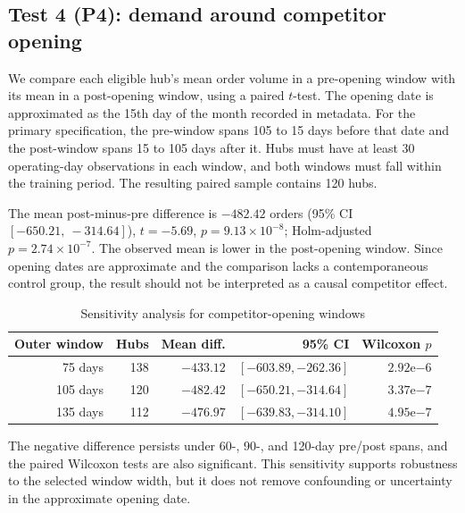 \documentclass[10pt,a4paper,twocolumn]{article}
\begin{document}
\subsection{Test 4 (P4): demand around competitor opening}
We compare each eligible hub's mean order volume in a pre-opening window with its mean in a post-opening window, using a paired $t$-test. The opening date is approximated as the 15th day of the month recorded in metadata. For the primary specification, the pre-window spans 105 to 15 days before that date and the post-window spans 15 to 105 days after it. Hubs must have at least 30 operating-day observations in each window, and both windows must fall within the training period. The resulting paired sample contains 120 hubs.

The mean post-minus-pre difference is $-482.42$ orders (95\% CI $[-650.21,\ -314.64]$), $t=-5.69$, $p=9.13\times10^{-8}$; Holm-adjusted $p=2.74\times10^{-7}$. The observed mean is lower in the post-opening window. Since opening dates are approximate and the comparison lacks a contemporaneous control group, the result should not be interpreted as a causal competitor effect.

\begin{table}[t]
\centering
\caption{Sensitivity analysis for competitor-opening windows}
\label{tab:sensitivity}
\scriptsize
\begin{tabular}{rrrrr}
\toprule
Outer window & Hubs & Mean diff. & 95\% CI & Wilcoxon $p$\\
\midrule
75 days & 138 & $-433.12$ & $[-603.89,-262.36]$ & $2.92\mathrm{e}{-6}$\\
105 days & 120 & $-482.42$ & $[-650.21,-314.64]$ & $3.37\mathrm{e}{-7}$\\
135 days & 112 & $-476.97$ & $[-639.83,-314.10]$ & $4.95\mathrm{e}{-7}$\\
\bottomrule
\end{tabular}
\end{table}

The negative difference persists under 60-, 90-, and 120-day pre/post spans, and the paired Wilcoxon tests are also significant. This sensitivity supports robustness to the selected window width, but it does not remove confounding or uncertainty in the approximate opening date.
\end{document}
